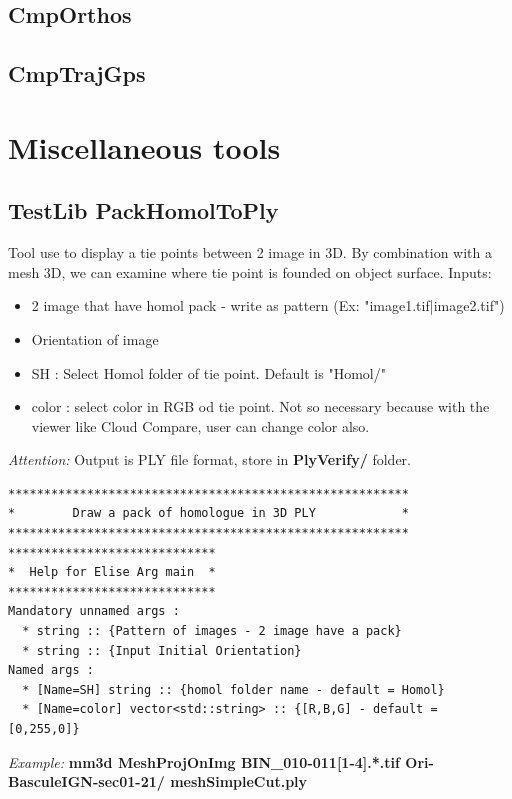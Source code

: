 \subsection{CmpOrthos}

\subsection{CmpTrajGps}


\section{Miscellaneous tools}

\subsection{TestLib PackHomolToPly}
Tool use to display a tie points between 2 image in 3D. By combination with a mesh 3D, we can examine where tie point is founded on object surface.
Inputs:
\begin{itemize}
\item 2 image that have homol pack - write as pattern (Ex: "image1.tif|image2.tif")
\item Orientation of image
\item SH : Select Homol folder of tie point. Default is "Homol/"
\item color : select color in RGB od tie point. Not so necessary because with the viewer like Cloud Compare, user can change color also.
\end{itemize}
\textit{Attention:} Output is PLY file format, store in \textbf{PlyVerify/} folder.

\begin{verbatim}
********************************************************
*        Draw a pack of homologue in 3D PLY            *
********************************************************
*****************************
*  Help for Elise Arg main  *
*****************************
Mandatory unnamed args : 
  * string :: {Pattern of images - 2 image have a pack}
  * string :: {Input Initial Orientation}
Named args : 
  * [Name=SH] string :: {homol folder name - default = Homol}
  * [Name=color] vector<std::string> :: {[R,B,G] - default = [0,255,0]}

\end{verbatim}
\textit{Example:}
\textbf{mm3d MeshProjOnImg BIN\_010-011[1-4].*.tif Ori-BasculeIGN-sec01-21/ meshSimpleCut.ply}

